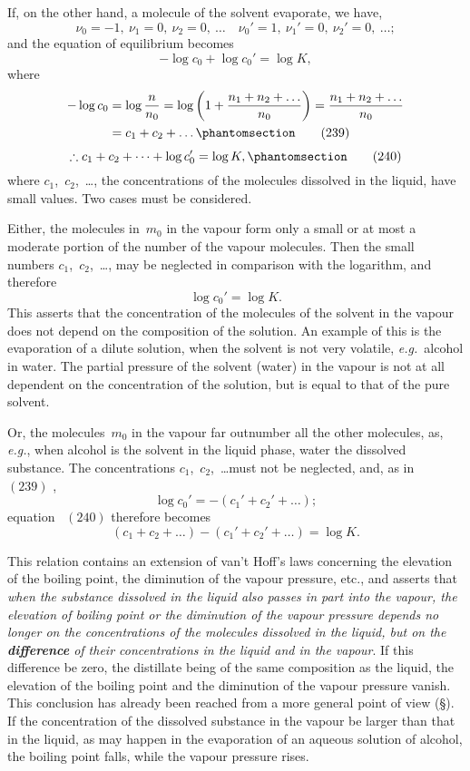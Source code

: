 \documentclass[12pt]{book}[2005/09/16]
\newcommand{\Chg}[2]{#2}
\newcommand{\Add}[1]{\Chg{}{#1}}
\newcommand{\SecRef}[2][§\;]{\hyperref[section:#2.]{{\upshape #1#2}}}
\newcommand{\Tag}[1]{%
  \phantomsection\label{eqn:#1}\tag*{\ensuremath{#1}}%
}
\newcommand{\Eq}[1]{%
  \hyperref[eqn:#1]{\ensuremath{#1}}%
}
\newcommand{\PageSep}[1]{\ignorespaces}
\newcommand{\eg}{\emph{e.g.}}
\newcommand{\Emph}[1]{\emph{\textbf{#1}}}
\begin{document}
If, on the other hand, a molecule of the solvent
evaporate, we have,
\[
\nu_{0} = -1,\
\nu_{1} = 0,\
\nu_{2} = 0,\ \dots\quad
\nu_{0}' = 1,\
\nu_{1}' = 0,\
\nu_{2}' = 0\Add{,}\ \dots;
\]
and the equation of equilibrium becomes
\[
-\log c_{0} + \log c_{0}' = \log K,
\]
where
\begin{align*}
-\log c_{0}
  &= \log \frac{n}{n_{0}}
   = \log \left(1 + \frac{n_{1} + n_{2} + \dots}{n_{0}}\right)
   = \frac{n_{1} + n_{2} + \dots}{n_{0}} \\
  &= c_{1} + c_{2} + \dots
\Tag{(239)}
\end{align*}
\[
\therefore
c_{1} + c_{2} + \dots + \log c_{0}' = \log K,
\Tag{(240)}
\]
where $c_{1}$,~$c_{2}$,~\dots, the concentrations of the molecules dissolved
in the liquid, have small values. Two cases must be
considered.

Either, the molecules in~$m_{0}$ in the vapour form only a small
or at most a moderate portion of the number of the vapour
molecules. Then the small numbers $c_{1}$,~$c_{2}$,~\dots, may be
neglected in comparison with the logarithm, and therefore
\[
\log c_{0}' = \log K.
\]
This asserts that the concentration of the molecules of
the solvent in the vapour does not depend on the composition
of the solution. An example of this is the evaporation
of a dilute solution, when the solvent is not very volatile,
\eg\ alcohol in water. The partial pressure of the solvent
(water) in the vapour is not at all dependent on the concentration
of the solution, but is equal to that of the pure
solvent.

Or, the molecules~$m_{0}$ in the vapour far outnumber all
the other molecules, as, \eg, when alcohol is the solvent in
\PageSep{255}
the liquid phase, water the dissolved substance. The concentrations
$c_{1}$,~$c_{2}$,~\dots must not be neglected, and, as in~\Eq{(239)},
\[
\log c_{0}' = -(c_{1}' + c_{2}' + \dots);
\]
equation~\Eq{(240)} therefore becomes
\[
(c_{1} + c_{2} + \dots) - (c_{1}' + c_{2}' + \dots) = \log K.
\]

This relation contains an extension of van't Hoff's laws
\index{Laws:!Van't Hoff's}%
concerning the elevation of the boiling point, the diminution
of the vapour pressure, etc., and asserts that \emph{when the
substance dissolved in the liquid also passes in part into the
vapour, the elevation of boiling point or the diminution of
the vapour pressure depends no longer on the concentrations
of the molecules dissolved in the liquid, but on the \Emph{difference}
of their concentrations in the liquid and in the vapour}.
If this difference be zero, the distillate being of the same
composition as the liquid, the elevation of the boiling point
and the diminution of the vapour pressure vanish. This
conclusion has already been reached from a more general
point of view (\SecRef{219}). If the concentration of the dissolved
substance in the vapour be larger than that in the liquid,
as may happen in the evaporation of an aqueous solution of
alcohol, the boiling point falls, while the vapour pressure
rises.
\end{document}
